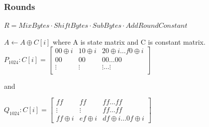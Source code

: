 \documentclass{beamer}
\begin{document}


\begin{frame}
\frametitle{Rounds}
\begin{center}$ R = MixBytes \cdot ShiftBytes \cdot SubBytes \cdot AddRoundConstant $ \end{center}
$A \gets A \oplus C[i]$ where A is state matrix and C is constant matrix.
$ P_{1024}: C[i] = \begin{bmatrix}
  00 \oplus i & 10 \oplus i & 20 \oplus i \ldots f0 \oplus i \\
  00          & 00          & 00          \dots  00          \\
  \vdots      & \vdots      & \vdots      \dots  \vdots      \\
\end{bmatrix}$

and 

$Q_{1024}: C[i] = \begin{bmatrix}
  ff          & ff          & ff          \dots ff          \\
  \vdots      & \vdots      & ff          \dots ff          \\
  ff \oplus i & ef \oplus i & df \oplus i \dots 0f \oplus i
\end{bmatrix}$
\end{frame}
\end{document}

